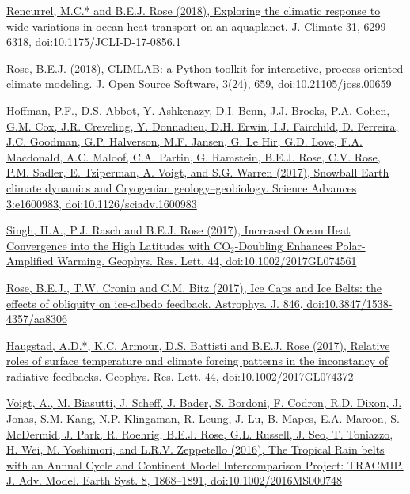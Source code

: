 \documentclass[11pt, letterpaper]{article} %
\newcommand{\years}[1]{\marginnote{\scriptsize #1}} %
\newcommand{\publink}{http://www.atmos.albany.edu/facstaff/brose/resources/Publications/}
\begin{document}
\years{2018} 
\href{\publink Rencurrel_Rose_jcli-d-17-0856.1.pdf}{Rencurrel, M.C.* and \underline{B.E.J. Rose} (2018), Exploring the climatic response to wide variations in ocean heat transport on an aquaplanet. J. Climate 31, 6299--6318, doi:10.1175/JCLI-D-17-0856.1} 
\vspace{0.2 cm}

\href{\publink Rose_JOSS2018.pdf}{\underline{Rose, B.E.J.} (2018), CLIMLAB: a Python toolkit for interactive, process-oriented climate modeling. J. Open Source Software, 3(24), 659, doi:10.21105/joss.00659}
\vspace{0.2 cm}

\years{2017} 
\href{http://advances.sciencemag.org/content/3/11/e1600983}{Hoffman, P.F., D.S. Abbot, Y. Ashkenazy, D.I. Benn, J.J. Brocks, P.A. Cohen, G.M. Cox, J.R. Creveling, Y. Donnadieu, D.H. Erwin, I.J. Fairchild, D. Ferreira, J.C. Goodman, G.P. Halverson, M.F. Jansen, G. Le Hir, G.D. Love, F.A. Macdonald, A.C. Maloof, C.A. Partin, G. Ramstein, \underline{B.E.J. Rose}, C.V. Rose, P.M. Sadler, E. Tziperman, A. Voigt, and S.G. Warren (2017), Snowball Earth climate dynamics and Cryogenian geology--geobiology. Science Advances 3:e1600983, doi:10.1126/sciadv.1600983}
\vspace{0.2 cm}

\href{\publink Singh_et_al-2017-Geophysical_Research_Letters-2.pdf}{Singh, H.A., P.J. Rasch and \underline{B.E.J. Rose} (2017), Increased Ocean Heat Convergence into the High Latitudes with CO$_2$-Doubling Enhances Polar-Amplified Warming. Geophys. Res. Lett. 44, doi:10.1002/2017GL074561}
\vspace{0.2 cm}

\href{\publink Rose_2017_ApJ_846_28.pdf}{\underline{Rose, B.E.J.}, T.W. Cronin and C.M. Bitz (2017), Ice Caps and Ice Belts: the effects of obliquity on ice-albedo feedback. Astrophys. J. 846, doi:10.3847/1538-4357/aa8306}
\vspace{0.2 cm}

\href{\publink Haugstad_et_al-2017-Geophysical_Research_Letters.pdf}{Haugstad, A.D.*, K.C. Armour, D.S. Battisti and \underline{B.E.J. Rose} (2017), Relative roles of surface temperature and climate forcing patterns in the inconstancy of radiative feedbacks. Geophys. Res. Lett. 44, doi:10.1002/2017GL074372}
\vspace{0.2 cm}

\years{2016}
\href{\publink Voigt_et_al-2016-TRACMIP.pdf}{Voigt, A., M. Biasutti, J. Scheff, J. Bader, S. Bordoni, F. Codron, R.D. Dixon, J. Jonas, S.M. Kang, N.P. Klingaman, R. Leung, J. Lu, B. Mapes, E.A. Maroon, S. McDermid, J. Park, R. Roehrig, \underline{B.E.J. Rose}, G.L. Russell, J. Seo, T. Toniazzo, H. Wei, M. Yoshimori, and L.R.V. Zeppetello (2016), The Tropical Rain belts with an Annual Cycle and Continent Model Intercomparison Project: TRACMIP. J. Adv. Model. Earth Syst. 8, 1868--1891, doi:10.1002/2016MS000748}
\vspace{0.2 cm}
 
\end{document}
